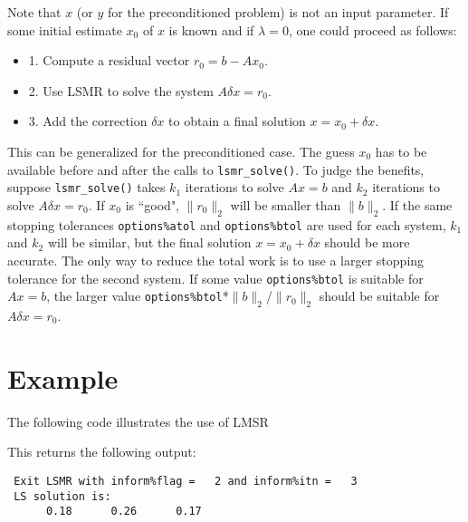      Note that $x$ (or $y$ for the preconditioned problem) is not an input
     parameter.
     If some initial estimate $x_0$ of $x$ is known and if $\lambda = 0$,
     one could proceed as follows:
    \begin{itemize} 
     \item 1. Compute a residual vector     $r_0 = b - Ax_0$.
    \item 2. Use LSMR to solve the system  $A \delta x = r_0$.
    \item 3. Add the correction $\delta x$ to obtain a final solution $x = x_0 + \delta x$.
    \end{itemize}
     This can be generalized for the preconditioned case.
     The guess $x_0$ has to be available before and after the calls
     to {\tt lsmr\_solve()}.  To judge the benefits, suppose {\tt lsmr\_solve()} takes $k_1$ iterations
     to solve $Ax = b$ and $k_2$ iterations to solve $A \delta x = r_0$.
     If $x_0$ is ``good", $\|r_0\|_2$ will be smaller than $\|b\|_2$.
     If the same stopping tolerances {\tt options\%atol} and {\tt options\%btol}
      are used for each
     system, $k_1$ and $k_2$ will be similar, but the final solution $x = x_0 + \delta x$
     should be more accurate.  The only way to reduce the total work
     is to use a larger stopping tolerance for the second system.
     If some value {\tt options\%btol} is suitable for $Ax=b$, the larger value
     {\tt options\%btol}*$\|b\|_2$/$\|r_0\|_2$  should be suitable for $A \delta x = r_0$.
    




\section{Example}
The following code illustrates the use of LMSR



This returns the following output:

\begin{verbatim}
 Exit LSMR with inform%flag =   2 and inform%itn =   3
 LS solution is:
      0.18      0.26      0.17
\end{verbatim}

\begin{funders}
\end{funders}
